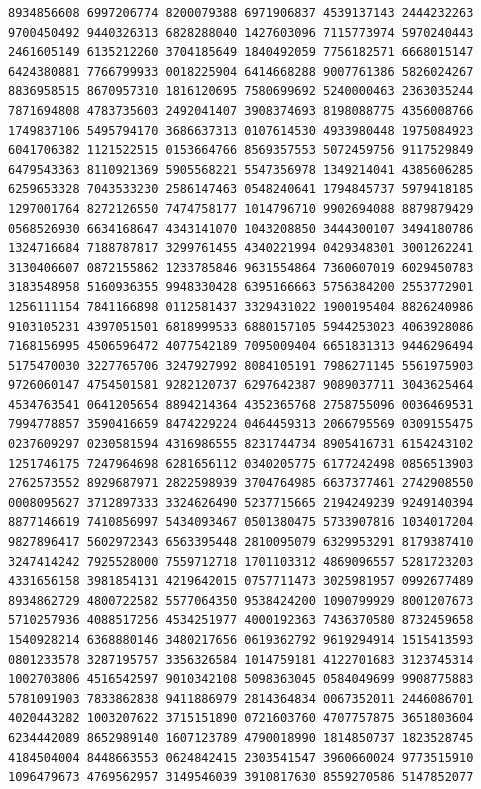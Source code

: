 \begin{Verbatim}[fontsize=\fontsize{6.4}{7.3}\selectfont]
8934856608 6997206774 8200079388 6971906837 4539137143 2444232263 9700450492 9440326313 6828288040 1427603096 7115773974 5970240443
2461605149 6135212260 3704185649 1840492059 7756182571 6668015147 6424380881 7766799933 0018225904 6414668288 9007761386 5826024267
8836958515 8670957310 1816120695 7580699692 5240000463 2363035244 7871694808 4783735603 2492041407 3908374693 8198088775 4356008766
1749837106 5495794170 3686637313 0107614530 4933980448 1975084923 6041706382 1121522515 0153664766 8569357553 5072459756 9117529849
6479543363 8110921369 5905568221 5547356978 1349214041 4385606285 6259653328 7043533230 2586147463 0548240641 1794845737 5979418185
1297001764 8272126550 7474758177 1014796710 9902694088 8879879429 0568526930 6634168647 4343141070 1043208850 3444300107 3494180786
1324716684 7188787817 3299761455 4340221994 0429348301 3001262241 3130406607 0872155862 1233785846 9631554864 7360607019 6029450783
3183548958 5160936355 9948330428 6395166663 5756384200 2553772901 1256111154 7841166898 0112581437 3329431022 1900195404 8826240986
9103105231 4397051501 6818999533 6880157105 5944253023 4063928086 7168156995 4506596472 4077542189 7095009404 6651831313 9446296494
5175470030 3227765706 3247927992 8084105191 7986271145 5561975903 9726060147 4754501581 9282120737 6297642387 9089037711 3043625464
4534763541 0641205654 8894214364 4352365768 2758755096 0036469531 7994778857 3590416659 8474229224 0464459313 2066795569 0309155475
0237609297 0230581594 4316986555 8231744734 8905416731 6154243102 1251746175 7247964698 6281656112 0340205775 6177242498 0856513903
2762573552 8929687971 2822598939 3704764985 6637377461 2742908550 0008095627 3712897333 3324626490 5237715665 2194249239 9249140394
8877146619 7410856997 5434093467 0501380475 5733907816 1034017204 9827896417 5602972343 6563395448 2810095079 6329953291 8179387410
3247414242 7925528000 7559712718 1701103312 4869096557 5281723203 4331656158 3981854131 4219642015 0757711473 3025981957 0992677489
8934862729 4800722582 5577064350 9538424200 1090799929 8001207673 5710257936 4088517256 4534251977 4000192363 7436370580 8732459658
1540928214 6368880146 3480217656 0619362792 9619294914 1515413593 0801233578 3287195757 3356326584 1014759181 4122701683 3123745314
1002703806 4516542597 9010342108 5098363045 0584049699 9908775883 5781091903 7833862838 9411886979 2814364834 0067352011 2446086701
4020443282 1003207622 3715151890 0721603760 4707757875 3651803604 6234442089 8652989140 1607123789 4790018990 1814850737 1823528745
4184504004 8448663553 0624842415 2303541547 3960660024 9773515910 1096479673 4769562957 3149546039 3910817630 8559270586 5147852077

\end{Verbatim}
